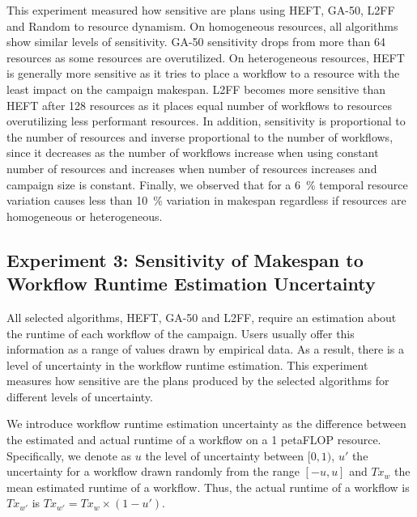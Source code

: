 This experiment measured how sensitive are plans using HEFT, GA-50, L2FF and Random to resource dynamism.
On homogeneous resources, all algorithms show similar levels of sensitivity.
GA-50 sensitivity drops from more than 64 resources as some resources are overutilized.
On heterogeneous resources, HEFT is generally more sensitive as it tries to place a workflow to a resource with the least impact on the campaign makespan.
L2FF becomes more sensitive than HEFT after 128 resources as it places equal number of workflows to resources overutilizing less performant resources.
In addition, sensitivity is proportional to the number of resources and inverse proportional to the number of workflows, since it decreases as the number of workflows increase when using constant number of resources and increases when number of resources increases and campaign size is constant.
Finally, we observed that for a 6~\% temporal resource variation causes less than 10~\% variation in makespan regardless if resources are homogeneous or heterogeneous.


\subsection{Experiment 3: Sensitivity of Makespan to Workflow Runtime Estimation Uncertainty}

All selected algorithms, HEFT, GA-50 and L2FF, require an estimation about the runtime of each workflow of the campaign.
Users usually offer this information as a range of values drawn by empirical data.
As a result, there is a level of uncertainty in the workflow runtime estimation.
This experiment measures how sensitive are the plans produced by the selected algorithms for different levels of uncertainty.

We introduce workflow runtime estimation uncertainty as the difference between the estimated and actual runtime of a workflow on a 1 petaFLOP resource.
Specifically, we denote as $u$ the level of uncertainty between $[0,1)$, $u'$ the uncertainty for a workflow drawn randomly from the range $[-u,u]$ and $Tx_{w}$ the mean estimated runtime of a workflow.
Thus, the actual runtime of a workflow is $Tx_{w'}$ is $ Tx_{w'} = Tx_{w} \times (1-u')$.

